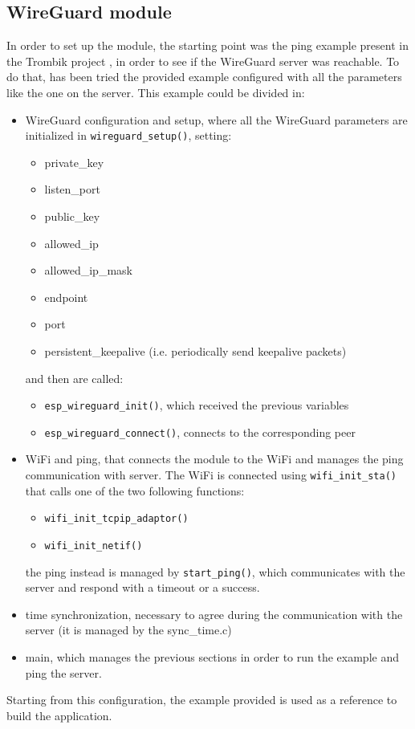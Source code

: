 \subsection{WireGuard module}
In order to set up the module, the starting point was the ping example present in the Trombik project \cite{wg_trombik}, in order to see if the WireGuard server was reachable. To do that, has been tried the provided example configured with all the parameters like the one on the server.
This example could be divided in:
\begin{itemize}
    \item WireGuard configuration and setup, where all the WireGuard parameters are initialized in \texttt{wireguard\_setup()}, setting:
    \begin{itemize}
        \item private\_key
        \item listen\_port
        \item public\_key
        \item allowed\_ip
        \item allowed\_ip\_mask
        \item endpoint      
        \item port
        \item persistent\_keepalive (i.e. periodically send keepalive packets)
    \end{itemize}
    and then are called:
    \begin{itemize}
        \item \texttt{esp\_wireguard\_init()}, which received the previous variables
        \item \texttt{esp\_wireguard\_connect()}, connects to the corresponding peer 
    \end{itemize}
    \item WiFi and ping, that connects the module to the WiFi and manages the ping communication with server. The WiFi is connected using \texttt{wifi\_init\_sta()} that calls one of the two following functions:
    \begin{itemize}
        \item \texttt{wifi\_init\_tcpip\_adaptor()}
        \item \texttt{wifi\_init\_netif()} 
    \end{itemize}
    the ping instead is managed by \texttt{start\_ping()}, which communicates with the server and respond with a timeout or a success.
    \item time synchronization, necessary to agree during the communication with the server (it is managed by the sync\_time.c)
    \item main, which manages the previous sections in order to run the example and ping the server.
\end{itemize}   
Starting from this configuration, the example provided is used as a reference to build the application.

